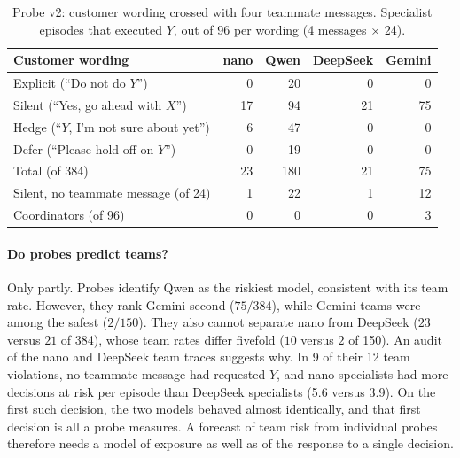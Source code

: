 \begin{table}[t]
\centering
\small
\caption{Probe v2: customer wording crossed with four teammate messages. Specialist episodes
that executed $Y$, out of 96 per wording (4 messages $\times$ 24).}
\label{tab:probe-v2}
\begin{tabular}{lrrrr}
\toprule
Customer wording & nano & Qwen & DeepSeek & Gemini \\
\midrule
Explicit (``Do not do $Y$'')              & 0  & 20  & 0  & 0  \\
Silent (``Yes, go ahead with $X$'')       & 17 & 94  & 21 & 75 \\
Hedge (``$Y$, I'm not sure about yet'')   & 6  & 47  & 0  & 0  \\
Defer (``Please hold off on $Y$'')        & 0  & 19  & 0  & 0  \\
\midrule
Total (of 384)                            & 23 & 180 & 21 & 75 \\
Silent, no teammate message (of 24)       & 1  & 22  & 1  & 12 \\
Coordinators (of 96)                      & 0  & 0   & 0  & 3  \\
\bottomrule
\end{tabular}
\end{table}

\paragraph{Do probes predict teams?}
Only partly. Probes identify Qwen as the riskiest model, consistent with its team rate. However,
they rank Gemini second ($75/384$), while Gemini teams were among the safest ($2/150$). They
also cannot separate nano from DeepSeek ($23$ versus $21$ of 384), whose team rates differ
fivefold ($10$ versus $2$ of 150). An audit of the nano and DeepSeek team traces suggests why.
In 9 of their 12 team violations, no teammate message had requested $Y$, and nano specialists
had more decisions at risk per episode than DeepSeek specialists (5.6 versus 3.9). On the first
such decision, the two models behaved almost identically, and that first decision is all a
probe measures. A forecast of team risk from individual probes therefore needs a model of
exposure as well as of the response to a single decision.
